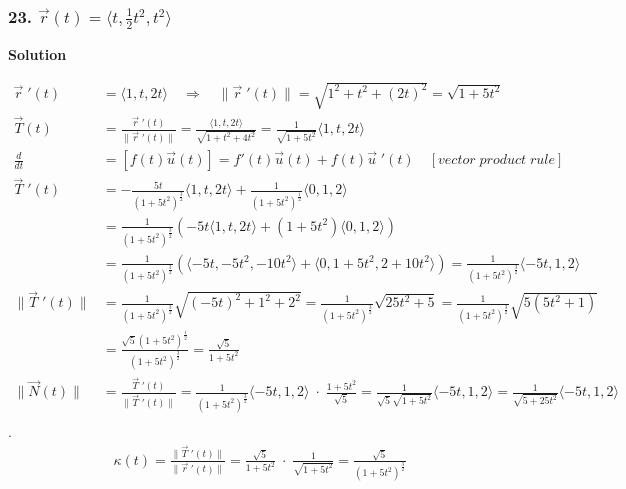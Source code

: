 \documentclass{article}
\newcommand{\drvec}{\vec{r}\;'(t)}
\newcommand\rr{\quad\Rightarrow\quad}
\begin{document}
\subsubsection*{23. $\vec{r}(t) = \langle{t, \frac{1}{2}t^2, t^2} \rangle$}
\centerline{\textbf{Solution}}
\begin{align*}
    \drvec &= \langle 1, t, 2t \rangle \rr \|\drvec\| = \sqrt{1^2 + t^2 + (2t)^2} = \sqrt{1 + 5t^2} \\ 
    \vec T(t) &= \frac{\drvec}{\|\drvec\|} = \frac{\langle 1, t, 2t \rangle}{\sqrt{1 + t^2 + 4t^2}} = \frac{1}{\sqrt{1 + 5t^2}}\langle 1, t, 2t \rangle \\
    \frac{d}{dt} &= [f(t)\vec u (t)] = f'(t)\vec u (t) + f(t)\vec u \;'(t) \quad [vector\;product\;rule] \\  
    \vec T\;'(t) &= -\frac{5t}{(1+5t^2)^{\frac 3 2}}\langle 1, t, 2t\rangle + \frac{1}{(1+5t^2)^\frac 1 2}\langle 0, 1, 2 \rangle \\
                 &= \frac{1}{(1+5t^2)^{\frac 3 2}}\left(-5t \langle 1, t, 2t \rangle + (1+5t^2)\langle 0, 1, 2 \rangle\right) \\
                 &= \frac{1}{(1+5t^2)^{\frac 3 2}}\left(\langle -5t, -5t^2, -10t^2 \rangle + \langle 0, 1+5t^2, 2+10t^2 \rangle\right) = \frac{1}{(1+5t^2)^{\frac 3 2}} \langle -5t, 1, 2 \rangle \\
    \|\vec T\;'(t)\| &= \frac{1}{(1+5t^2)^{\frac 3 2}}\sqrt{(-5t)^2 + 1^2 + 2^2} = \frac{1}{(1+5t^2)^{\frac 3 2}}\sqrt{25t^2 + 5} = \frac{1}{(1+5t^2)^{\frac 3 2}}\sqrt{5(5t^2 + 1)} \\
                     &= \frac{\sqrt 5 (1+5t^2)^{\frac 1 2}}{(1+5t^2)^{\frac 3 2}} = \frac{\sqrt 5}{1+5t^2} \\
    \|\vec N(t)\| &=  \frac{\vec T\;'(t)}{\|\vec T\;'(t)\|} = \frac{1}{(1+5t^2)^{\frac 3 2}} \langle -5t, 1, 2 \rangle \; \cdot \; \frac{1+5t^2}{\sqrt 5} = \frac{1}{\sqrt 5\sqrt{1+5t^2}} \langle -5t, 1, 2 \rangle  = \frac{1}{\sqrt{5+25t^2}}\langle -5t, 1, 2 \rangle\\ 
\end{align*}
.
\begin{align*}
    \kappa(t) = \frac{\|\vec T\;'(t)\|}{\|\drvec\|} = \frac{\sqrt 5}{1+5t^2} \; \cdot \; \frac{1}{\sqrt{1+5t^2}} = \frac{\sqrt 5}{(1+5t^2)^{\frac 3 2}}
\end{align*}
\end{document}
